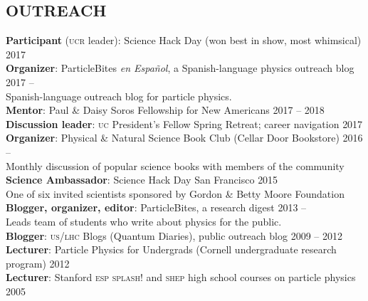 \documentclass[margin,line]{resume}
\newcommand{\scap}[1]{\textsc{\MakeLowercase{#1}}}
\begin{document}
\begin{resume}
\section{\footnotesize \sc
\sffamily 
{}OUTREACH
}
%
\textbf{Participant} (\scap{UCR} leader): Science Hack Day (won best in show, most whimsical)
 \hfill {2017}\vspace{-.75mm}
\\
%
\textbf{Organizer}: ParticleBites \emph{en Espa\~nol}, a Spanish-language physics outreach blog
 \hfill {2017 -- \phantom{2017}}\vspace{-.75mm}
\\
%
\phantom{..} {\small Spanish-language outreach blog for particle physics.}
\\
%
\textbf{Mentor}: Paul \& Daisy Soros Fellowship for New Americans
 \hfill {2017 -- {2018}}\\
%
\textbf{Discussion leader}: \scap{UC} President's Fellow Spring Retreat; career navigation
 \hfill {2017}\\
%
\textbf{Organizer}: Physical \& Natural Science Book Club (Cellar Door Bookstore)
 \hfill {2016 -- \phantom{2016}}\vspace{-.75mm}
\\
\phantom{..} {\small Monthly discussion of popular science books with members of the community}
\\
%
\textbf{Science Ambassador}: Science Hack Day San Francisco 
\hfill {2015}\vspace{-.75mm}
\\
\phantom{..} {\small One of six invited scientists sponsored by Gordon \& Betty Moore Foundation}
\\
%
\textbf{Blogger, organizer, editor}: ParticleBites, a research digest 
\hfill {2013 -- \phantom{2016}}
\vspace{-.75mm} \\
\phantom{..} {\small Leads team of students who write about physics for the public.}
\\
%
\textbf{Blogger}: \scap{US/LHC} Blogs (Quantum Diaries), public outreach blog \hfill {2009 -- 2012}\\
\textbf{Lecturer}: Particle Physics for Undergrads (Cornell undergraduate research program) \hfill {2012}\\
\textbf{Lecturer}: Stanford \scap{ESP} \scap{SPLASH!} and \scap{SHEP} high school courses on particle physics \hfill {2005}%



\end{resume}
\end{document}
